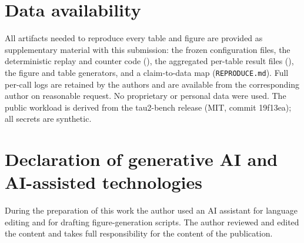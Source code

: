 \documentclass[preprint,12pt]{elsarticle}
\begin{document}
\section*{Data availability}
All artifacts needed to reproduce every table and figure are provided as supplementary material
with this submission: the frozen configuration files, the deterministic replay and counter code
(), the aggregated per-table result files (), the figure
and table generators, and a claim-to-data map (\texttt{REPRODUCE.md}). Full per-call logs are
retained by the authors and are available from the corresponding author on reasonable request. No
proprietary or personal data were used. The public workload is derived from the tau2-bench release (MIT, commit
19f13ea); all secrets are synthetic.

\section*{Declaration of generative AI and AI-assisted technologies}
During the preparation of this work the author used an AI assistant for language editing and for
drafting figure-generation scripts. The author reviewed and edited the content and takes full
responsibility for the content of the publication.



\end{document}
